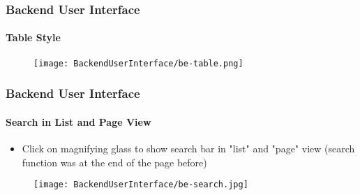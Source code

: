 
\begin{frame}[fragile]
	\frametitle{Backend User Interface}
	\framesubtitle{Table Style}

	\begin{figure}
		\texttt{[image: BackendUserInterface/be-table.png]}
	\end{figure}

\end{frame}


\begin{frame}[fragile]
	\frametitle{Backend User Interface}
	\framesubtitle{Search in List and Page View}

	\begin{itemize}
		\item Click on magnifying glass to show search bar in "list" and "page" view\newline
			(search function was at the end of the page before)
	\end{itemize}

	\begin{figure}
		\texttt{[image: BackendUserInterface/be-search.jpg]}
	\end{figure}

\end{frame}



